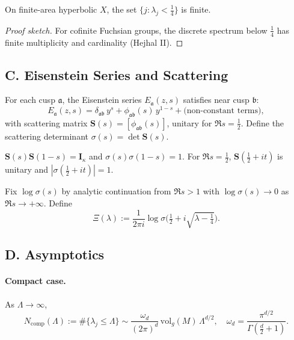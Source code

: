 \begin{proposition}
\label{prop:finite-small}
On finite-area hyperbolic $X$, the set $\{j:\lambda_j<\tfrac14\}$ is finite.
\end{proposition}

\begin{proof}[Proof sketch]
For cofinite Fuchsian groups, the discrete spectrum below $\tfrac14$ has finite multiplicity and cardinality (Hejhal II).
\end{proof}

\subsection*{C. Eisenstein Series and Scattering}
\label{subsec:eisenstein}

\begin{definition}
\label{def:eisenstein}
For each cusp $\mathfrak a$, the Eisenstein series $E_{\mathfrak a}(z,s)$ satisfies near cusp $\mathfrak b$:
\[
  E_{\mathfrak a}(z,s)=\delta_{\mathfrak a\mathfrak b}\,y^s+\phi_{\mathfrak a\mathfrak b}(s)\,y^{1-s}+\text{(non-constant terms)},
\]
with scattering matrix $\mathbf S(s)=[\phi_{\mathfrak a\mathfrak b}(s)]$, unitary for $\Re s=\tfrac12$. Define the scattering determinant $\sigma(s)=\det\mathbf S(s)$.
\end{definition}

\begin{lemma}
\label{lem:unitarity}
$\mathbf S(s)\mathbf S(1-s)=\mathbf I_\kappa$ and $\sigma(s)\sigma(1-s)=1$. For $\Re s=\tfrac12$, $\mathbf S(\tfrac12+it)$ is unitary and $|\sigma(\tfrac12+it)|=1$.
\end{lemma}

\begin{definition}
\label{def:branch}
Fix $\log\sigma(s)$ by analytic continuation from $\Re s>1$ with $\log\sigma(s)\to 0$ as $\Re s\to +\infty$. Define
\[
  \Xi(\lambda):=\frac{1}{2\pi i}\log\sigma\!\Big(\tfrac12+i\sqrt{\lambda-\tfrac14}\Big).
\]
\end{definition}

\subsection*{D. Asymptotics}
\label{subsec:weyl-selberg}

\paragraph{Compact case.} As $\Lambda\to\infty$,
\[
  N_{\mathrm{comp}}(\Lambda):=\#\{\lambda_j\le \Lambda\}
  \sim \frac{\omega_d}{(2\pi)^d}\,\mathrm{vol}_g(M)\,\Lambda^{d/2},
\quad \omega_d=\frac{\pi^{d/2}}{\Gamma(\frac d2+1)}.
\]

